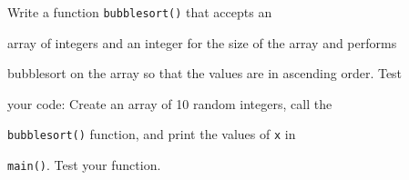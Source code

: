 Write a function \texttt{bubblesort()} that accepts an

array of integers and an integer for the size of the array and performs

bubblesort on the array so that the values are in ascending order. Test

your code: Create an array of 10 random integers, call the

\texttt{bubblesort()} function, and print the values of \texttt{x} in

\texttt{main()}. Test your function.

